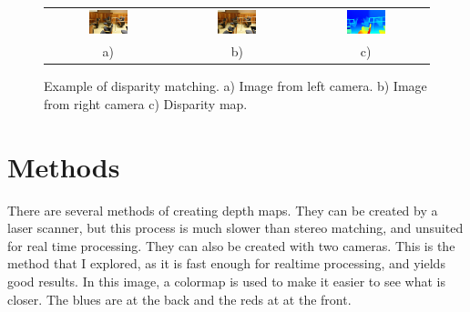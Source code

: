 \documentclass[11pt,fleqn]{article}
\begin{document}
\begin{figure}[!ht]
\label{fig:example1}
\centering
\setlength{}
\begin{tabular}{ccc}
\includegraphics[width=0.33\textwidth]{images/im0-600.jpg} &
\includegraphics[width=0.33\textwidth]{images/im1-600.jpg} &
\includegraphics[width=0.33\textwidth]{images/disp-600.jpg} \\[2pt]
a) & b) & c) \\
\end{tabular}
\caption{Example of disparity matching. a) Image from left camera. b) Image from right camera c) Disparity map.}
\end{figure}


\section{Methods}
There are several methods of creating depth maps.
They can be created by a laser scanner, but this process is much slower than stereo matching, and unsuited for real time processing. They can also be created with two cameras. This is the method that I explored, as it is fast enough for realtime processing, and yields good results. In this image, a colormap is used to make it easier to see what is closer. The blues are at the back and the reds at at the front.
\end{document}
